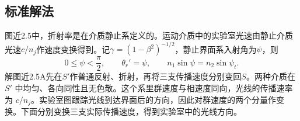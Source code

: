\documentclass[UTF8,fontset=fandol,a4paper,11pt]{ctexart}
\begin{document}

\subsection*{标准解法}


图近2.5中，折射率是在介质静止系定义的。运动介质中的实验室光速由静止介质光速$c/n_j$作速度变换得到。记$\gamma=(1-\beta^2)^{-1/2}$，静止界面系入射角为$\psi$，则
\[
0\le\psi<\frac\pi2,\qquad
\theta_r'=\psi,\qquad n_1\sin\psi=n_2\sin\psi_t.
\]
解图近2.5A先在$S'$作普通反射、折射，再将三支传播速度分别变回$S$。两种介质在 $S'$ 中均匀、各向同性且无色散。这个系里群速度与相速度同向，光线的传播速率为 $c/n_j$。实验室图跟踪光线到达界面后的方向，因此对群速度的两个分量作变换。下面分别变换三支实际传播速度，得到实验室中的光线方向。

\begin{center}\begin{minipage}{.98\linewidth}\centering
\begin{tikzpicture}[scale=.85,transform shape]

\end{tikzpicture}
\end{minipage}
\end{center}
\end{document}

